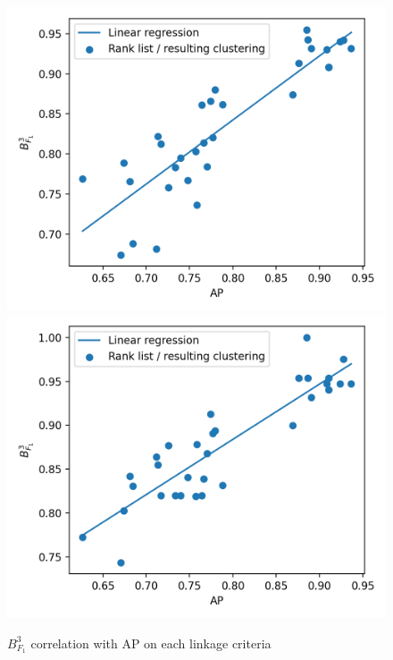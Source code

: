 \begin{figure}
  \caption{$B^3_{F_1}$ correlation with AP on each linkage criteria}
  \label{fig:correlation_average_precision_b3f1}

  \includegraphics[width=\linewidth]{img/correlation_average_precision_b3f1_0.png}
  \includegraphics[width=\linewidth]{img/correlation_average_precision_b3f1_1.png}

\end{figure}
